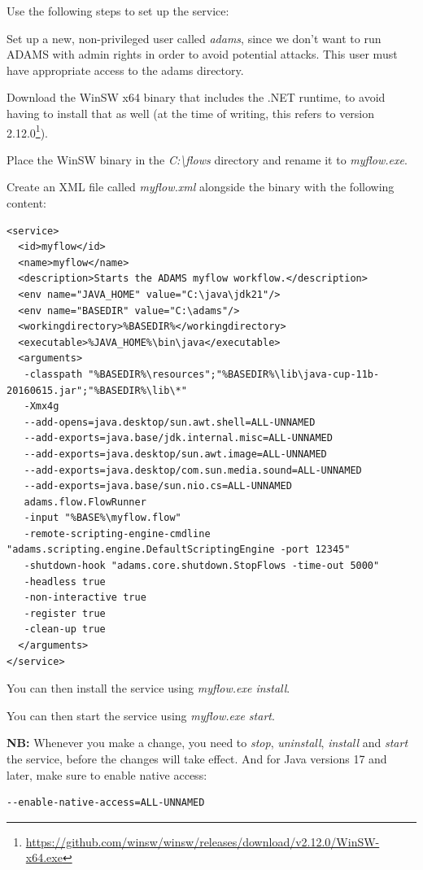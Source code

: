 \noindent Use the following steps to set up the service:
\begin{tight_itemize}
  \item Set up a new, non-privileged user called \textit{adams}, since we
  don't want to run ADAMS with admin rights in order to avoid potential attacks.
  This user must have appropriate access to the adams directory.
  \item Download the WinSW x64 binary that includes the .NET runtime, to avoid having
  to install that as well (at the time of writing, this refers to version
  2.12.0\footnote{\url{https://github.com/winsw/winsw/releases/download/v2.12.0/WinSW-x64.exe}{}}).
  \item Place the WinSW binary in the \textit{C:\textbackslash flows} directory and rename it
  to \textit{myflow.exe}.
  \item Create an XML file called \textit{myflow.xml} alongside the binary with the following content:
  {\scriptsize
  \begin{verbatim}
<service>
  <id>myflow</id>
  <name>myflow</name>
  <description>Starts the ADAMS myflow workflow.</description>
  <env name="JAVA_HOME" value="C:\java\jdk21"/>
  <env name="BASEDIR" value="C:\adams"/>
  <workingdirectory>%BASEDIR%</workingdirectory>
  <executable>%JAVA_HOME%\bin\java</executable>
  <arguments>
   -classpath "%BASEDIR%\resources";"%BASEDIR%\lib\java-cup-11b-20160615.jar";"%BASEDIR%\lib\*"
   -Xmx4g
   --add-opens=java.desktop/sun.awt.shell=ALL-UNNAMED
   --add-exports=java.base/jdk.internal.misc=ALL-UNNAMED
   --add-exports=java.desktop/sun.awt.image=ALL-UNNAMED
   --add-exports=java.desktop/com.sun.media.sound=ALL-UNNAMED
   --add-exports=java.base/sun.nio.cs=ALL-UNNAMED
   adams.flow.FlowRunner
   -input "%BASE%\myflow.flow"
   -remote-scripting-engine-cmdline "adams.scripting.engine.DefaultScriptingEngine -port 12345"
   -shutdown-hook "adams.core.shutdown.StopFlows -time-out 5000"
   -headless true
   -non-interactive true
   -register true
   -clean-up true
  </arguments>
</service>
  \end{verbatim}}
  \item You can then install the service using \textit{myflow.exe install}.
  \item You can then start the service using \textit{myflow.exe start}.
\end{tight_itemize}
\textbf{NB:} Whenever you make a change, you need to \textit{stop}, \textit{uninstall},
\textit{install} and \textit{start} the service, before the changes will take effect.
And for Java versions 17 and later, make sure to enable native access:
\begin{verbatim}
--enable-native-access=ALL-UNNAMED
\end{verbatim}


